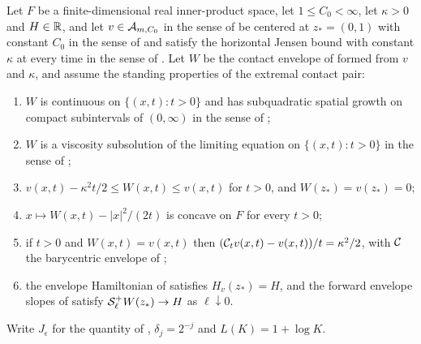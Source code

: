\begin{lemma}
Let $F$ be a finite-dimensional real inner-product space, let
$1\le C_0<\infty$, let $\kappa>0$ and $H\in\mathbb{R}$, and let $v\in\mathcal{A}_{m,C_0}$
in the sense of  be centered at $z_*=(0,1)$ with constant
$C_0$ in the sense of  and satisfy the horizontal Jensen
bound with constant $\kappa$ at every time in the sense of
. Let $W$ be the contact envelope of
 formed from $v$ and $\kappa$, and assume the standing
properties of the extremal contact pair:
\begin{enumerate}
\item $W$ is continuous on $\{(x,t):t>0\}$ and has subquadratic spatial growth
on compact subintervals of $(0,\infty)$ in the sense of
;
\item $W$ is a viscosity subsolution of the limiting equation on
$\{(x,t):t>0\}$ in the sense of ;
\item $v(x,t)-\kappa^2t/2\le W(x,t)\le v(x,t)$ for $t>0$, and
$W(z_*)=v(z_*)=0$;
\item $x\mapsto W(x,t)-|x|^2/(2t)$ is concave on $F$ for every $t>0$;
\item if $t>0$ and $W(x,t)=v(x,t)$ then $(\mathcal{C}_tv(x,t)-v(x,t))/t=\kappa^2/2$,
with $\mathcal{C}$ the barycentric envelope of ;
\item the envelope Hamiltonian of  satisfies
$H_v(z_*)=H$, and the forward envelope slopes of  satisfy
$\mathcal{S}_\ell^+W(z_*)\to H$ as $\ell\downarrow0$.
\end{enumerate}
Write $J_\epsilon$ for the quantity of , $\delta_j=2^{-j}$ and
$L(K)=1+\log K$.


\end{lemma}

